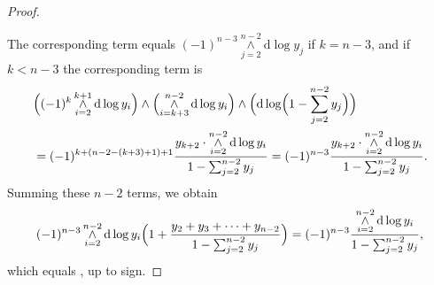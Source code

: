 \documentclass[10pt,a4paper]{amsart}
\begin{document}
\begin{proof}
\begin{itemize}
\end{itemize}
The corresponding term equals $(-1)^{n-3}\mathop{\wedge}\limits_{j=2}^{n-2}\mathrm{d}\log y_j$ if $k=n-3$, and if $k<n-3$ the corresponding term is
\begin{align}
& \Bigl((-1)^k \mathop{\wedge}\limits_{i=2}^{k+1} \mathrm{d}\log y_i \Bigr) 
\wedge 
\Bigl(\mathop{\wedge}\limits_{i=k+3}^{n-2} \mathrm{d}\log y_i \Bigr)  
\wedge 
\Bigl(\mathrm{d}\log \Bigl(1- \sum_{j=2}^{n-2}y_j \Bigr)\Bigr) \\ 
&= 
(-1)^{k+(n-2-(k+3)+1)+1} \frac{y_{k+2} \cdot \mathop{\wedge}\limits_{i=2}^{n-2} \mathrm{d}\log y_i}{1- \sum_{j=2}^{n-2}y_j}
= 
(-1)^{n-3} \frac{y_{k+2} \cdot \mathop{\wedge}\limits_{i=2}^{n-2} \mathrm{d}\log y_i}{1- \sum_{j=2}^{n-2}y_j} .
\end{align}
Summing these $n-2$ terms, we obtain
\[
(-1)^{n-3} \mathop{\wedge}\limits_{i=2}^{n-2} 
\mathrm{d}\log y_i \Bigl(1+ \frac{y_2+y_3+\cdots+y_{n-2}}{1- \sum_{j=2}^{n-2}y_j}\Bigr) 
= (-1)^{n-3} \frac{\mathop{\wedge}\limits_{i=2}^{n-2} \mathrm{d}\log y_i}{1- \sum_{j=2}^{n-2}y_j},
\]
which equals , up to sign.
\end{proof}
\end{document}

